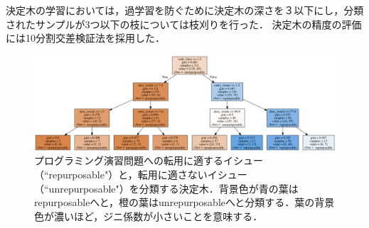 
決定木の学習においては，過学習を防ぐために決定木の深さを３以下にし，分類されたサンプルが3つ以下の枝については枝刈りを行った．
決定木の精度の評価には10分割交差検証法を採用した．




\begin{figure}[t]
	\centering
  \includegraphics[width=1.0\columnwidth]{graph_20190125.png}
  \caption{プログラミング演習問題への転用に適するイシュー（``repurposable"）と，転用に適さないイシュー（``unrepurposable"）を分類する決定木．背景色が青の葉はrepurposableへと，橙の葉はunrepurposableへと分類する．葉の背景色が濃いほど，ジニ係数が小さいことを意味する．}
  \label{fig:dtgraph}
\end{figure}


